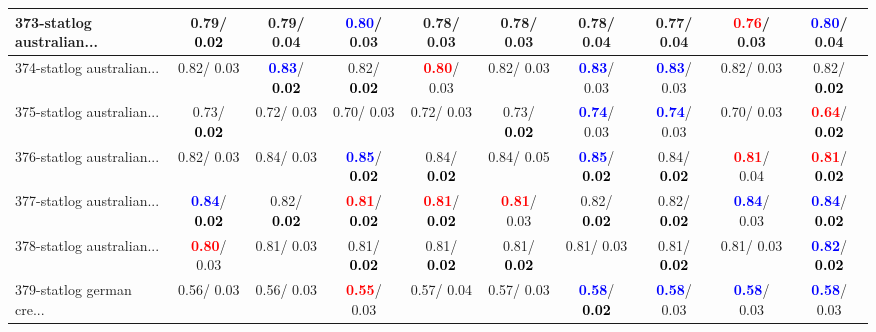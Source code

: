 \begin{table}[h]
\begin{center}
{\begin{tabular}{lc|c|c|c|c|c|c|c|c}
373-statlog australian... &   0.79/\textcolor{black}{\textbf{  0.02}} &   0.79/  0.04 & \textcolor{blue}{\textbf{  0.80}}/  0.03 &   0.78/  0.03 &   0.78/  0.03 &   0.78/  0.04 &   0.77/  0.04 & \textcolor{red}{\textbf{  0.76}}/  0.03 & \textcolor{blue}{\textbf{  0.80}}/  0.04 \\ \hline
374-statlog australian... &   0.82/  0.03 & \textcolor{blue}{\textbf{  0.83}}/\textcolor{black}{\textbf{  0.02}} &   0.82/\textcolor{black}{\textbf{  0.02}} & \textcolor{red}{\textbf{  0.80}}/  0.03 &   0.82/  0.03 & \textcolor{blue}{\textbf{  0.83}}/  0.03 & \textcolor{blue}{\textbf{  0.83}}/  0.03 &   0.82/  0.03 &   0.82/\textcolor{black}{\textbf{  0.02}} \\
375-statlog australian... &   0.73/\textcolor{black}{\textbf{  0.02}} &   0.72/  0.03 &   0.70/  0.03 &   0.72/  0.03 &   0.73/\textcolor{black}{\textbf{  0.02}} & \textcolor{blue}{\textbf{  0.74}}/  0.03 & \textcolor{blue}{\textbf{  0.74}}/  0.03 &   0.70/  0.03 & \textcolor{red}{\textbf{  0.64}}/\textcolor{black}{\textbf{  0.02}} \\
376-statlog australian... &   0.82/  0.03 &   0.84/  0.03 & \textcolor{blue}{\textbf{  0.85}}/\textcolor{black}{\textbf{  0.02}} &   0.84/\textcolor{black}{\textbf{  0.02}} &   0.84/  0.05 & \textcolor{blue}{\textbf{  0.85}}/\textcolor{black}{\textbf{  0.02}} &   0.84/\textcolor{black}{\textbf{  0.02}} & \textcolor{red}{\textbf{  0.81}}/  0.04 & \textcolor{red}{\textbf{  0.81}}/\textcolor{black}{\textbf{  0.02}} \\
377-statlog australian... & \textcolor{blue}{\textbf{  0.84}}/\textcolor{black}{\textbf{  0.02}} &   0.82/\textcolor{black}{\textbf{  0.02}} & \textcolor{red}{\textbf{  0.81}}/\textcolor{black}{\textbf{  0.02}} & \textcolor{red}{\textbf{  0.81}}/\textcolor{black}{\textbf{  0.02}} & \textcolor{red}{\textbf{  0.81}}/  0.03 &   0.82/\textcolor{black}{\textbf{  0.02}} &   0.82/\textcolor{black}{\textbf{  0.02}} & \textcolor{blue}{\textbf{  0.84}}/  0.03 & \textcolor{blue}{\textbf{  0.84}}/\textcolor{black}{\textbf{  0.02}} \\
378-statlog australian... & \textcolor{red}{\textbf{  0.80}}/  0.03 &   0.81/  0.03 &   0.81/\textcolor{black}{\textbf{  0.02}} &   0.81/\textcolor{black}{\textbf{  0.02}} &   0.81/\textcolor{black}{\textbf{  0.02}} &   0.81/  0.03 &   0.81/\textcolor{black}{\textbf{  0.02}} &   0.81/  0.03 & \textcolor{blue}{\textbf{  0.82}}/\textcolor{black}{\textbf{  0.02}} \\
379-statlog german cre... &   0.56/  0.03 &   0.56/  0.03 & \textcolor{red}{\textbf{  0.55}}/  0.03 &   0.57/  0.04 &   0.57/  0.03 & \textcolor{blue}{\textbf{  0.58}}/\textcolor{black}{\textbf{  0.02}} & \textcolor{blue}{\textbf{  0.58}}/  0.03 & \textcolor{blue}{\textbf{  0.58}}/  0.03 & \textcolor{blue}{\textbf{  0.58}}/  0.03 \\

\end{tabular}}
\end{center}
\end{table}
